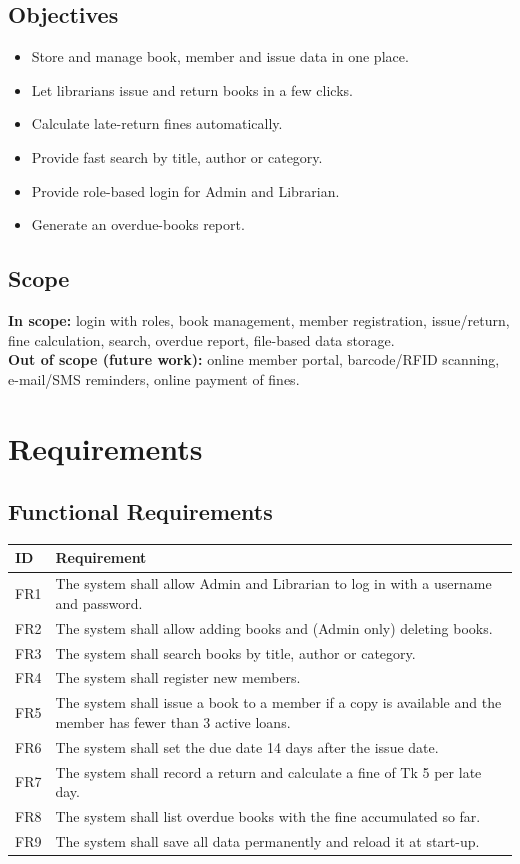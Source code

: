 \documentclass[12pt,a4paper]{article}
\begin{document}
\subsection{Objectives}
\begin{itemize}[nosep]
\item Store and manage book, member and issue data in one place.
\item Let librarians issue and return books in a few clicks.
\item Calculate late-return fines automatically.
\item Provide fast search by title, author or category.
\item Provide role-based login for Admin and Librarian.
\item Generate an overdue-books report.
\end{itemize}

\subsection{Scope}
\textbf{In scope:} login with roles, book management, member registration, issue/return, fine calculation, search, overdue report, file-based data storage.\\
\textbf{Out of scope (future work):} online member portal, barcode/RFID scanning, e-mail/SMS reminders, online payment of fines.

\section{Requirements}
\subsection{Functional Requirements}
\begin{longtable}{@{}l p{}@{}}
\toprule ID & Requirement \\ \midrule \endhead
FR1 & The system shall allow Admin and Librarian to log in with a username and password. \\
FR2 & The system shall allow adding books and (Admin only) deleting books. \\
FR3 & The system shall search books by title, author or category. \\
FR4 & The system shall register new members. \\
FR5 & The system shall issue a book to a member if a copy is available and the member has fewer than 3 active loans. \\
FR6 & The system shall set the due date 14 days after the issue date. \\
FR7 & The system shall record a return and calculate a fine of Tk 5 per late day. \\
FR8 & The system shall list overdue books with the fine accumulated so far. \\
FR9 & The system shall save all data permanently and reload it at start-up. \\ \bottomrule
\end{longtable}
\end{document}
